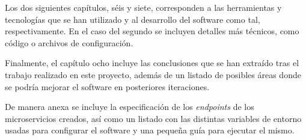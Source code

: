 Los dos siguientes capítulos, séis y siete, corresponden a las herramientas y tecnologías que se han utilizado y al desarrollo del software como tal, respectivamente. En el caso del segundo se incluyen detalles más técnicos, como código o archivos de configuración.

Finalmente, el capítulo ocho incluye las conclusiones que se han extraído tras el trabajo realizado en este proyecto, además de un listado de posibles áreas donde se podría mejorar el software en posteriores iteraciones.

De manera anexa se incluye la especificación de los \textit{endpoints} de los microservicios creados, así como un listado con las distintas variables de entorno usadas para configurar el software y una pequeña guía para ejecutar el mismo.

